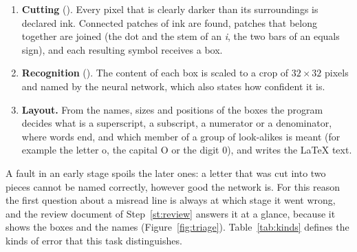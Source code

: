 \begin{enumerate}
\item \textbf{Cutting} (). Every pixel that is clearly darker than its
  surroundings is declared ink. Connected patches of ink are found, patches that belong
  together are joined (the dot and the stem of an \emph{i}, the two bars of an equals sign),
  and each resulting symbol receives a box.
\item \textbf{Recognition} (). The content of each box is scaled to a
  crop of $32 \times 32$ pixels and named by the neural network, which also states how
  confident it is.
\item \textbf{Layout.} From the names, sizes and positions of the boxes the program decides
  what is a superscript, a subscript, a numerator or a denominator, where words end, and which
  member of a group of look-alikes is meant (for example the letter o, the capital O or the
  digit 0), and writes the \LaTeX{} text.
\end{enumerate}

A fault in an early stage spoils the later ones: a letter that was cut into two pieces cannot
be named correctly, however good the network is. For this reason the first question about a
misread line is always at which stage it went wrong, and the review document of
Step~\ref{st:review} answers it at a glance, because it shows the boxes and the names
(Figure~\ref{fig:triage}). Table~\ref{tab:kinds} defines the kinds of error that this task
distinguishes.

